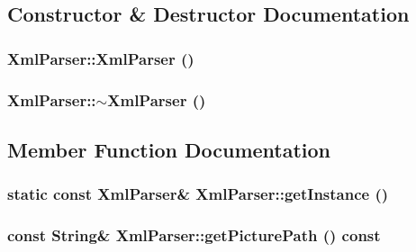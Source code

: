 \subsection{Constructor \& Destructor Documentation}
\hypertarget{class_xml_parser_c77b14a84c93a07288b7dcd9d3a17397}{
\subsubsection[{XmlParser}]{\setlength{\rightskip}{0pt plus 5cm}XmlParser::XmlParser ()}}
\label{class_xml_parser_c77b14a84c93a07288b7dcd9d3a17397}


\hypertarget{class_xml_parser_e3078c5ea3b5c79258a92513b55d8511}{
\subsubsection[{$\sim$XmlParser}]{\setlength{\rightskip}{0pt plus 5cm}XmlParser::$\sim$XmlParser ()}}
\label{class_xml_parser_e3078c5ea3b5c79258a92513b55d8511}




\subsection{Member Function Documentation}
\hypertarget{class_xml_parser_bceee41ee0f57113f981d57f065a5e21}{
\subsubsection[{getInstance}]{\setlength{\rightskip}{0pt plus 5cm}static const {\bf XmlParser}\& XmlParser::getInstance ()}}
\label{class_xml_parser_bceee41ee0f57113f981d57f065a5e21}


\hypertarget{class_xml_parser_a19caec11bd5e78884329d7cb5571409}{
\subsubsection[{getPicturePath}]{\setlength{\rightskip}{0pt plus 5cm}const String\& XmlParser::getPicturePath () const}}
\label{class_xml_parser_a19caec11bd5e78884329d7cb5571409}


